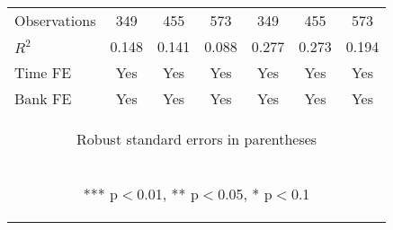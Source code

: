 \documentclass[]{article}
\begin{document}
\begin{center}
\begin{tabular}{lcccccc}
Observations & 349 & 455 & 573 & 349 & 455 & 573 \\
$R^2$ & 0.148 & 0.141 & 0.088 & 0.277 & 0.273 & 0.194 \\
Time FE & Yes & Yes & Yes & Yes & Yes & Yes \\
 Bank FE & Yes & Yes & Yes & Yes & Yes & Yes \\ \hline
\multicolumn{7}{c}{\begin{footnotesize} Robust standard errors in parentheses\end{footnotesize}} \\
\multicolumn{7}{c}{\begin{footnotesize} *** p$<$0.01, ** p$<$0.05, * p$<$0.1\end{footnotesize}} \\
\end{tabular}
\end{center}
\end{document}
